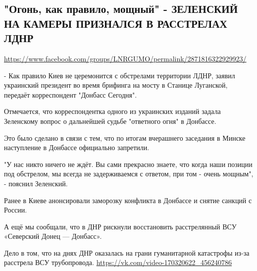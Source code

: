  
 

\subsection{"Огонь, как правило, мощный" - ЗЕЛЕНСКИЙ НА КАМЕРЫ ПРИЗНАЛСЯ В РАССТРЕЛАХ ЛДНР}
\url{https://www.facebook.com/groups/LNRGUMO/permalink/2871816322929923/}


- Как правило Киев не церемонится с обстрелами территории ЛДНР, заявил
украинский президент во время брифинга на мосту в Станице Луганской, передаёт
корреспондент "Донбасс Сегодня".

Отмечается, что корреспондентка одного из украинских изданий задала Зеленскому
вопрос о дальнейшей судьбе "ответного огня" в Донбассе.

Это было сделано в связи с тем, что по итогам вчерашнего заседания в Минске
наступление в Донбассе официально запретили.

"У нас никто ничего не ждёт. Вы сами прекрасно знаете, что когда наши позиции
под обстрелом, мы всегда не задерживаемся с ответом, при том - очень мощным", -
пояснил Зеленский.

Ранее в Киеве анонсировали заморозку конфликта в Донбассе и снятие санкций с
России.

А ещё мы сообщали, что в ДНР рискнули восстановить расстрелянный ВСУ «Северский
Донец --- Донбасс».

Дело в том, что на днях ДНР оказалась на грани гуманитарной катастрофы из-за
расстрела ВСУ трубопровода.  \url{https://vk.com/video-170320622_456240786}
  
